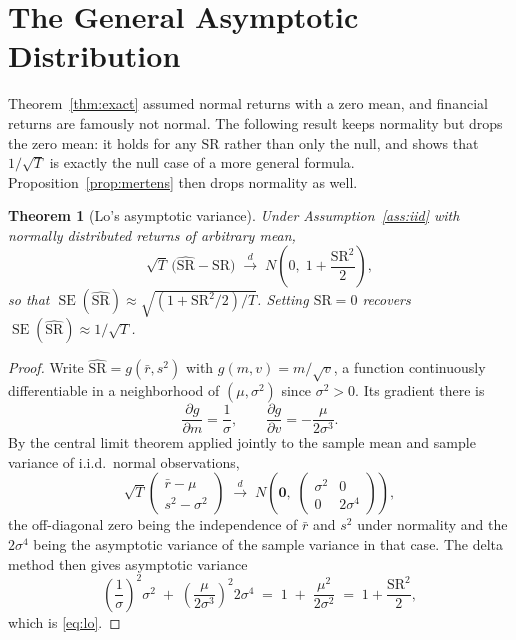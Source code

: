\documentclass[11pt]{article}
\newtheorem{theorem}{Theorem}
\theoremstyle{remark}
\theoremstyle{definition}
\newcommand{\SR}{\text{SR}}
\newcommand{\SRhat}{\widehat{\text{SR}}}
\begin{document}
\section{The General Asymptotic Distribution}
\label{sec:asymptotic}

Theorem~\ref{thm:exact} assumed normal returns with a zero mean, and financial returns are famously not normal. The following result keeps normality but drops the zero mean: it holds for any $\SR$ rather than only the null, and shows that $1/\sqrt{T}$ is exactly the null case of a more general formula. Proposition~\ref{prop:mertens} then drops normality as well.

\begin{theorem}[Lo's asymptotic variance]
\label{thm:lo}
Under Assumption~\ref{ass:iid} with normally distributed returns of arbitrary mean,
\begin{equation}
\label{eq:lo}
\sqrt{T}\,\big(\SRhat - \SR\big) \;\xrightarrow{\;d\;}\; N\!\left(0,\; 1 + \frac{\SR^2}{2}\right),
\end{equation}
so that $\operatorname{SE}(\SRhat) \approx \sqrt{(1+\SR^2/2)/T}$. Setting $\SR = 0$ recovers $\operatorname{SE}(\SRhat) \approx 1/\sqrt{T}$.
\end{theorem}

\begin{proof}
Write $\SRhat = g(\bar r, s^2)$ with $g(m,v) = m/\sqrt{v}$, a function continuously differentiable in a neighborhood of $(\mu,\sigma^2)$ since $\sigma^2>0$. Its gradient there is
\begin{equation*}
\frac{\partial g}{\partial m} = \frac{1}{\sigma}, \qquad
\frac{\partial g}{\partial v} = -\frac{\mu}{2\sigma^3}.
\end{equation*}
By the central limit theorem applied jointly to the sample mean and sample variance of i.i.d.\ normal observations,
\begin{equation*}
\sqrt{T}\begin{pmatrix} \bar r - \mu \\ s^2 - \sigma^2\end{pmatrix}
\;\xrightarrow{\;d\;}\;
N\!\left(\mathbf{0},\; \begin{pmatrix} \sigma^2 & 0 \\ 0 & 2\sigma^4 \end{pmatrix}\right),
\end{equation*}
the off-diagonal zero being the independence of $\bar r$ and $s^2$ under normality and the $2\sigma^4$ being the asymptotic variance of the sample variance in that case. The delta method then gives asymptotic variance
\begin{equation*}
\left(\frac{1}{\sigma}\right)^{\!2}\sigma^2 \;+\; \left(\frac{\mu}{2\sigma^3}\right)^{\!2} 2\sigma^4
\;=\; 1 \;+\; \frac{\mu^2}{2\sigma^2} \;=\; 1 + \frac{\SR^2}{2},
\end{equation*}
which is \eqref{eq:lo}.
\end{proof}
\end{document}

